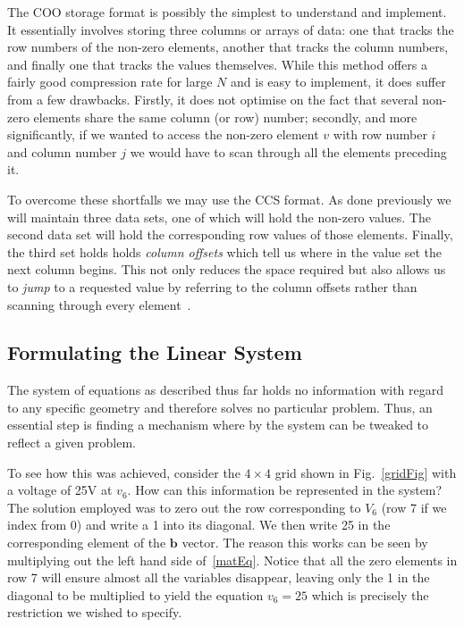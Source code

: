 \documentclass[a4paper]{article}
\renewcommand{\vec}[1]{\bm{#1}}
\begin{document}
The COO storage format is possibly the simplest to understand and implement. It
essentially involves storing three columns or arrays of data: one that tracks
the row numbers of the non-zero elements, another that tracks the column
numbers, and finally one that tracks the values themselves. While this method
offers a fairly good compression rate for large $N$ and is easy to implement,
it does suffer from a few drawbacks. Firstly, it does not optimise on the fact
that several non-zero elements share the same column (or row) number; secondly,
and more significantly, if we wanted to access the non-zero element $v$ with
row number $i$ and column number $j$ we would have to scan through all the
elements preceding it.

To overcome these shortfalls we may use the CCS format. As done previously we
will maintain three data sets, one of which will hold the non-zero values. The
second data set will hold the corresponding row values of those elements.
Finally, the third set holds holds \emph{column offsets} which tell us where in
the value set the next column begins. This not only reduces the space required
but also allows us to \emph{jump} to a requested value by referring to the
column offsets rather than scanning through every element~\cite{101matstore}.

\subsection{Formulating the Linear System}
The system of equations as described thus far holds no information with regard
to any specific geometry and therefore solves no particular problem. Thus, an
essential step is finding a mechanism where by the system can be tweaked to
reflect a given problem.

To see how this was achieved, consider the $4 \times 4$ grid shown
in Fig.~\ref{gridFig} with a voltage of 25V at $v_6$. How can this information
be represented in the system? The solution employed was to zero out the row
corresponding to $V_6$ (row 7 if we index from 0) and write a 1 into its
diagonal. We then write 25 in the corresponding element of the $\vec{b}$
vector. The reason this works can be seen by multiplying out the left hand side
of~\eqref{matEq}. Notice that all the zero elements in row 7 will ensure almost
all the variables disappear, leaving only the 1 in the diagonal to be
multiplied to yield the equation $v_6=25$ which is precisely the restriction we
wished to specify.
\end{document}
